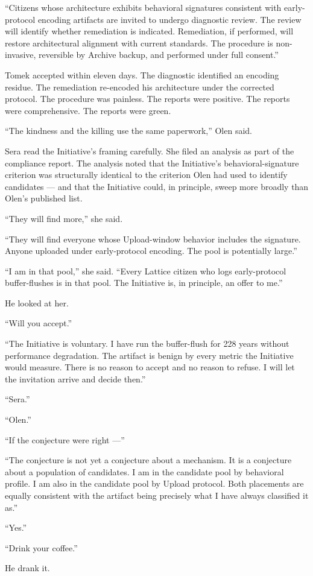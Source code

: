 \enquote{Citizens whose architecture exhibits behavioral signatures consistent with early-protocol encoding artifacts are invited to undergo diagnostic review. The review will identify whether remediation is indicated. Remediation, if performed, will restore architectural alignment with current standards. The procedure is non-invasive, reversible by Archive backup, and performed under full consent.}

Tomek accepted within eleven days. The diagnostic identified an encoding residue. The remediation re-encoded his architecture under the corrected protocol. The procedure was painless. The reports were positive. The reports were comprehensive. The reports were green.

\enquote{The kindness and the killing use the same paperwork,} Olen said.

Sera read the Initiative's framing carefully. She filed an analysis as part of the compliance report. The analysis noted that the Initiative's behavioral-signature criterion was structurally identical to the criterion Olen had used to identify candidates — and that the Initiative could, in principle, sweep more broadly than Olen's published list.

\enquote{They will find more,} she said.

\enquote{They will find everyone whose Upload-window behavior includes the signature. Anyone uploaded under early-protocol encoding. The pool is potentially large.}

\enquote{I am in that pool,} she said. \enquote{Every Lattice citizen who logs early-protocol buffer-flushes is in that pool. The Initiative is, in principle, an offer to me.}

He looked at her.

\enquote{Will you accept.}

\enquote{The Initiative is voluntary. I have run the buffer-flush for 228 years without performance degradation. The artifact is benign by every metric the Initiative would measure. There is no reason to accept and no reason to refuse. I will let the invitation arrive and decide then.}

\enquote{Sera.}

\enquote{Olen.}

\enquote{If the conjecture were right —}

\enquote{The conjecture is not yet a conjecture about a mechanism. It is a conjecture about a population of candidates. I am in the candidate pool by behavioral profile. I am also in the candidate pool by Upload protocol. Both placements are equally consistent with the artifact being precisely what I have always classified it as.}

\enquote{Yes.}

\enquote{Drink your coffee.}

He drank it.

\clearpage